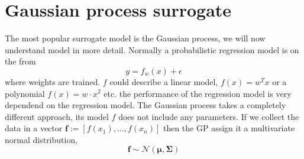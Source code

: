 \section{Gaussian process surrogate}

The most popular surrogate model is the Gaussian process, we will now understand model
in more detail. Normally a probabilistic regression model is on the from 
$$y = f_w(x) + \epsilon$$
where weights are trained. $f$ could describe a linear model, $f(x) = w^Tx$ or a polynomial
$f(x) = w\cdot x^2$ etc. the performance of the regression model is very dependend on the 
regression model. The Gaussian process takes a completely different approach, its model $f$ does not
include any parameters. If we collect the data in a vector $\textbf{f} := [f(x_1),\dots,f(x_n)]$
then the GP assign it a multivariate normal distribution, 
$$\textbf{f} \sim \mathcal{N}(\bm{\mu}, \bm{\Sigma})$$


